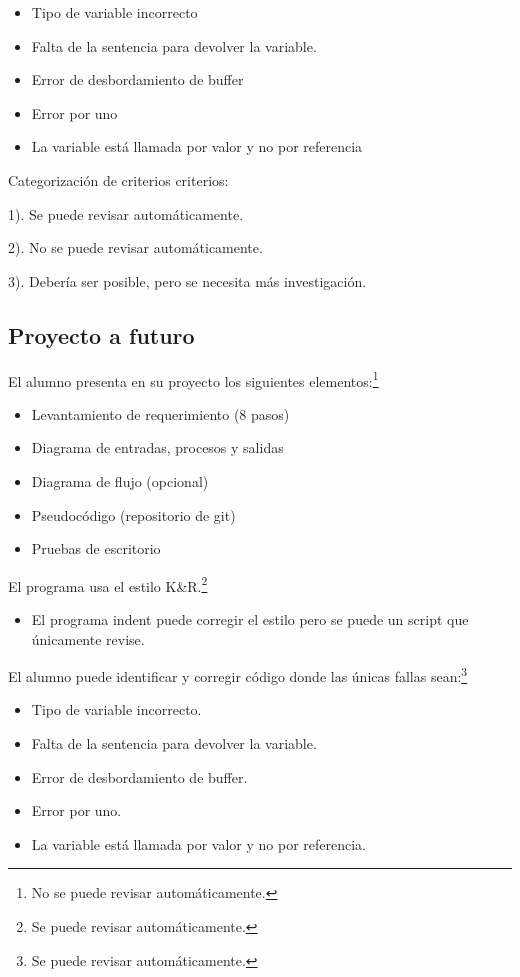 \documentclass[
  12,
]{scrartcl}
\providecommand{\tightlist}{%
  \setlength{\itemsep}{0pt}\setlength{\parskip}{0pt}}
\begin{document}
\begin{itemize}
\tightlist
\item
  Tipo de variable incorrecto
\item
  Falta de la sentencia para devolver la variable.
\item
  Error de desbordamiento de buffer
\item
  Error por uno
\item
  La variable está llamada por valor y no por referencia
\end{itemize}

Categorización de criterios criterios:

1). Se puede revisar automáticamente.

2). No se puede revisar automáticamente.

3). Debería ser posible, pero se necesita más investigación.

\hypertarget{proyecto-a-futuro}{%
\subsection{Proyecto a futuro}\label{proyecto-a-futuro}}

El alumno presenta en su proyecto los siguientes elementos:\footnote{No
  se puede revisar automáticamente.}

\begin{itemize}
\item
  Levantamiento de requerimiento (8 pasos)
\item
  Diagrama de entradas, procesos y salidas
\item
  Diagrama de flujo (opcional)
\item
  Pseudocódigo (repositorio de git)
\item
  Pruebas de escritorio
\end{itemize}

El programa usa el estilo K\&R.\footnote{Se puede revisar
  automáticamente.}

\begin{itemize}
\tightlist
\item
  El programa indent puede corregir el estilo pero se puede un script
  que únicamente revise.
\end{itemize}

El alumno puede identificar y corregir código donde las únicas fallas
sean:\footnote{Se puede revisar automáticamente.}

\begin{itemize}
\tightlist
\item
  Tipo de variable incorrecto.
\item
  Falta de la sentencia para devolver la variable.
\item
  Error de desbordamiento de buffer.
\item
  Error por uno.
\item
  La variable está llamada por valor y no por referencia.
\end{itemize}
\end{document}
